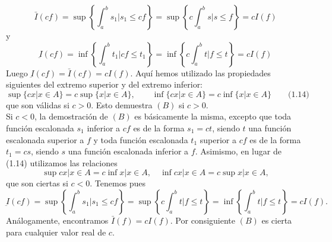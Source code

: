 \begin{teo}
    $$\bar{I}(cf) = \sup\left\{ \int_a^b s_1 | s_1 \leq cf\right\} = \sup\left\{c\int_a^b s | s \leq f\right\} = cI(f)$$
    y 
    $$\underbar{I}(cf) = \inf\left\{\int_a^b t_1 | cf \leq t_1\right\} = \inf\left\{c\int_a^b t | f \leq t\right\} = cI(f)$$
    Luego $\underbar{I}(cf)=\bar{I}(cf)=cI(f).$ Aquí hemos utilizado las propiedades siguientes del extremo superior y del extremo inferior:
    $$\sup \lbrace cx | x\in A \rbrace = c \sup \lbrace x|x\in A \rbrace,\qquad \inf \lbrace c x | x \in A\rbrace = c \inf\lbrace x|x\in A \rbrace \qquad \mbox{(1.14)}$$
    que son válidas si $c>0$. Esto demuestra $(B)$ si $c>0$.\\
    Si $c<0$, la demostración de $(B)$ es básicamente la misma, excepto que toda función escalonada $s_1$ inferior a $cf$ es de la forma $s_1=ct$, siendo $t$ una función escalonada superior a $f$ y toda función escalonada $t_1$ superior a $cf$ es de la forma $t_1=cs$, siendo $s$ una función escalonada inferior a $f$. Asimismo, en lugar de (1.14) utilizamos las relaciones 
    $$\sup{cx | x\in A} = c\inf{x | x \in A}, \quad \inf{cx | x \in A} = c \sup {x | x \in A},$$
    que son ciertas si $c<0$. Tenemos pues 
    $$\underbar{I}(cf) = \sup\left\{\int_a^b s_1 | s_1 \leq cf\right\}= \sup \left\{c \int_a^b t | f \leq t\right\} = \inf \left\{\int_a^b t | f \leq t\right\} = cI(f).$$
    Análogamente, encontramos $\bar{I}(f)=cI(f)$. Por consiguiente $(B)$ es cierta para cualquier valor real de $c$.\\\\

\end{teo}

